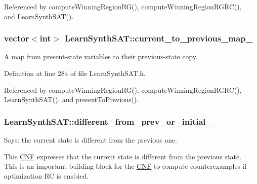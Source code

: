 Referenced by compute\-Winning\-Region\-R\-G(), compute\-Winning\-Region\-R\-G\-R\-C(), and Learn\-Synth\-S\-A\-T().

\hypertarget{classLearnSynthSAT_a98f676db61a949cd9c9626e165f378a4}{
\subsubsection[{current\-\_\-to\-\_\-previous\-\_\-map\-\_\-}]{\setlength{\rightskip}{0pt plus 5cm}vector$<$int$>$ Learn\-Synth\-S\-A\-T\-::current\-\_\-to\-\_\-previous\-\_\-map\-\_\-\hspace{0.3cm}{\ttfamily [protected]}}}\label{classLearnSynthSAT_a98f676db61a949cd9c9626e165f378a4}


A map from present-\/state variables to their previous-\/state copy. 



Definition at line 284 of file Learn\-Synth\-S\-A\-T.\-h.



Referenced by compute\-Winning\-Region\-R\-G(), compute\-Winning\-Region\-R\-G\-R\-C(), Learn\-Synth\-S\-A\-T(), and present\-To\-Previous().

\hypertarget{classLearnSynthSAT_a1b0ed51f21b9fbb8cc0954e011968389}{
\subsubsection[{different\-\_\-from\-\_\-prev\-\_\-or\-\_\-initial\-\_\-}]{ Learn\-Synth\-S\-A\-T\-::different\-\_\-from\-\_\-prev\-\_\-or\-\_\-initial\-\_\-\hspace{0.3cm}{\ttfamily [protected]}}}\label{classLearnSynthSAT_a1b0ed51f21b9fbb8cc0954e011968389}


Says\-: the current state is different from the previous one. 

This \hyperlink{classCNF}{C\-N\-F} expresses that the current state is different from the previous state. This is an important building block for the \hyperlink{classCNF}{C\-N\-F} to compute counterexamples if optimization R\-C is enabled. 

